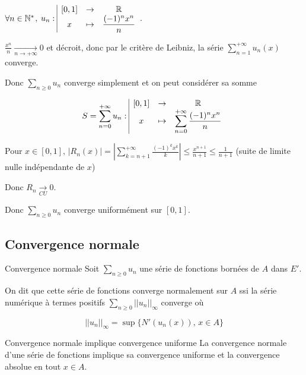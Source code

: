 \begin{exemple}
    $\forall n \in \mathbb{N}^*$, $u_n: \space \begin{array}{|ccc} \displaystyle [0, 1] & \to & \displaystyle \mathbb{R} \\ \displaystyle x & \mapsto & \displaystyle \frac{(-1)^n x^n}{n} \end{array}$.

    
    \avspace $\displaystyle \frac{x^n }{n } \xrightarrow[n\to +\infty]{} 0$ et décroit, 
    donc par le critère de Leibniz, la série $\displaystyle \sum_{n = 1}^{ + \infty } u_n(x)$ converge.

    Donc $\displaystyle \sum_{n \geqslant 0} u_n$ converge simplement et on peut considérer sa somme 

    $$S = \sum_{n = 0}^{ + \infty } u_n : \space \begin{array}{|ccc} \displaystyle [0, 1] & \to & \displaystyle \mathbb{R} \\ \displaystyle x & \mapsto & \displaystyle \sum_{n = 0}^{ + \infty } \frac{(-1)^n x^n}{n} \end{array}$$


    \avspace Pour $x \in [0, 1], \, \displaystyle |R_n(x)| = \left| \sum_{k = n + 1}^{ + \infty } \frac{(-1)^k x^k}{k} \right| \leqslant \frac{x^{n + 1}}{n + 1} \leqslant \frac 1 {n + 1}$ 
    (suite de limite nulle indépendante de $x$)

    Donc $\displaystyle R_n \xrightarrow[CU]{} 0$.

    Donc $\displaystyle \sum_{n \geqslant 0} u_n$ converge uniformément sur $[0, 1]$.
\end{exemple}


\subsection{Convergence normale}

\begin{definition}{Convergence normale}{}
    Soit $\displaystyle \sum_{n \geqslant 0} u_n$ une série de fonctions bornées de $A$ dans $E'$.

    On dit que cette série de fonctions converge normalement sur $A$ ssi la série numérique 
    à termes positifs $\displaystyle \sum_{n \geqslant 0} || u_n ||_{\infty}$ converge où 

    $$||u_n||_{\infty} = \sup\{ N'(u_n(x)), \, x \in A \}$$
\end{definition}

\begin{theoreme}{Convergence normale implique convergence uniforme}{}
    La convergence normale d'une série de fonctions implique sa convergence uniforme et la convergence 
    absolue en tout $x \in A$. 
\end{theoreme}

